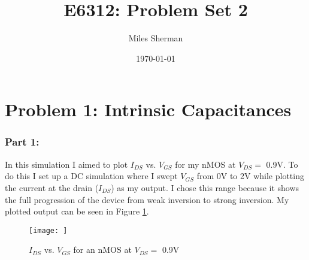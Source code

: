 \documentclass{article}
\begin{document}
\title{E6312: Problem Set 2}
\author{Miles Sherman}
\date{\today}
\maketitle

\section{Problem 1: Intrinsic Capacitances}
\subsubsection{Part 1: }
In this simulation I aimed to plot $I_{DS}$ vs. $V_{GS}$ for my nMOS at $V_{DS} =$ 0.9V. To do this I set up a DC simulation where I swept $V_{GS}$ from 0V to 2V while plotting the current at the drain ($I_{DS}$) as my output. I chose this range because it shows the full progression of the device from weak inversion to strong inversion. My plotted output can be seen in Figure \ref{1anmos}.
\begin{figure}[\h]
\centering
\texttt{[image: ]}
\caption{$I_{DS}$ vs. $V_{GS}$ for an nMOS at $V_{DS} =$ 0.9V}
\label{1anmos}
\end{figure}
\newpage
\end{document}
